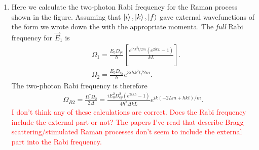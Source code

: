 \documentclass{article}
\theoremstyle{definition}
\newcommand{\f}[2]{\frac{#1}{#2}}
\newcommand{\lp}{\left(}
\newcommand{\rp}{\right)}
\newcommand{\lb}{\left[}
\newcommand{\rb}{\right]}
\begin{document}
\begin{enumerate}
\begin{enumerate}[label=(\alph*)]
%		
%		

	\item Here we calculate the two-photon Rabi frequency for the Raman process shown in the figure. Assuming that $\ket{i}, \ket{k}, \ket{f}$ gave external wavefunctions of the form we wrote down the with the appropriate momenta. The \textit{full} Rabi frequency for $\vec{E}_1$ is 
	\begin{align*}
	&\Omega_1 = \f{E_0 D_{ge}}{\hbar } \lb \f{ e^{ihk^2t/2m} (e^{2ikL} - 1)}{kL} \rb.\\
	&\Omega_2 = \f{E_0 D_{eg}}{\hbar } e^{3ihk^2 t/2m}.
	\end{align*}
	The two-photon Rabi frequency is therefore
	\begin{align*}
	\Omega_{R2} = \f{\Omega_1^* \Omega_2}{2\Delta} =  \f{i E_0^2D_{eg}^2  (e^{2ikL} - 1)}{4\hbar^2\Delta k L } e^{ik(-2Lm + \hbar k t)/m}.
	\end{align*}
	\textcolor{red}{I don't think any of these calculations are correct. Does the Rabi frequency include the external part or not? The papers I've read that describe Bragg scattering/stimulated Raman processes don't seem to include the external part into the Rabi frequency. }
	

\end{enumerate}
\end{enumerate}
\end{document}
